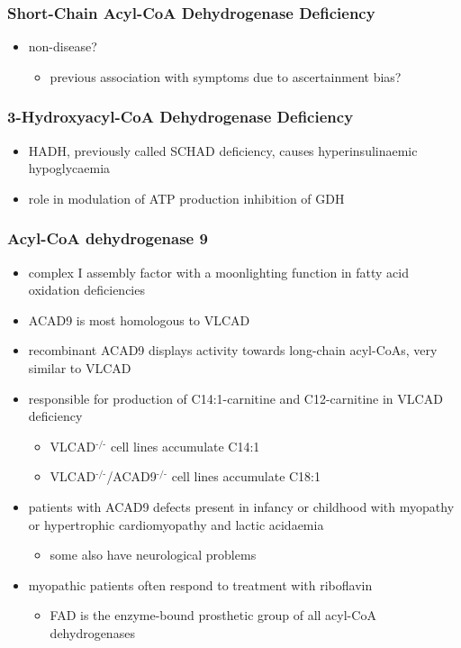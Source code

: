 \documentclass{scrartcl}
\begin{document}
\subsubsection{Short-Chain Acyl-CoA Dehydrogenase Deficiency}
\label{sec:org814b294}
\begin{itemize}
\item non-disease?
\begin{itemize}
\item previous association with symptoms due to ascertainment bias?
\end{itemize}
\end{itemize}

\subsubsection{3-Hydroxyacyl-CoA Dehydrogenase Deficiency}
\label{sec:org9462c50}
\begin{itemize}
\item HADH, previously called SCHAD deficiency, causes hyperinsulinaemic
hypoglycaemia
\item role in modulation of ATP production inhibition of GDH
\end{itemize}

\subsubsection{Acyl-CoA dehydrogenase 9}
\label{sec:orgfe224c0}
\begin{itemize}
\item complex I assembly factor with a moonlighting function in fatty
acid oxidation deficiencies
\item ACAD9 is most homologous to VLCAD
\item recombinant ACAD9 displays activity towards long-chain acyl-CoAs,
very similar to VLCAD
\item responsible for production of C14:1-carnitine and C12-carnitine in
VLCAD deficiency
\begin{itemize}
\item VLCAD\(^{\text{-/-}}\) cell lines accumulate C14:1
\item VLCAD\(^{\text{-/-}}\)/ACAD9\(^{\text{-/-}}\) cell lines accumulate C18:1
\end{itemize}
\item patients with ACAD9 defects present in infancy or childhood with
myopathy or hypertrophic cardiomyopathy and lactic acidaemia
\begin{itemize}
\item some also have neurological problems
\end{itemize}
\item myopathic patients often respond to treatment with riboflavin
\begin{itemize}
\item FAD is the enzyme-bound prosthetic group of all acyl-CoA
dehydrogenases
\end{itemize}
\end{itemize}
\end{document}
